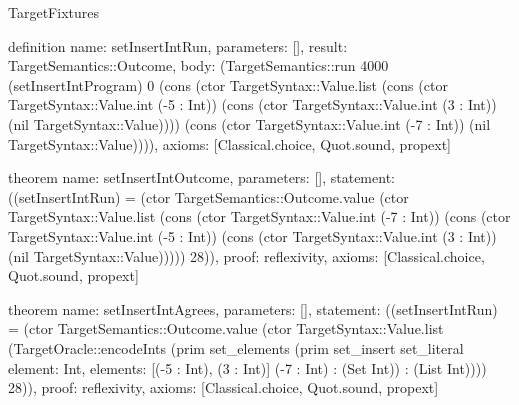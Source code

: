\begin{lexlean}{TargetFixtures}
\begin{semanticmodule}
definition{
  name: setInsertIntRun,
  parameters: [],
  result: TargetSemantics::Outcome,
  body: (TargetSemantics::run 4000 (setInsertIntProgram) 0 (cons (ctor TargetSyntax::Value.list (cons (ctor TargetSyntax::Value.int (-5 : Int)) (cons (ctor TargetSyntax::Value.int (3 : Int)) (nil TargetSyntax::Value)))) (cons (ctor TargetSyntax::Value.int (-7 : Int)) (nil TargetSyntax::Value)))),
  axioms: [Classical.choice, Quot.sound, propext]
}

theorem{
  name: setInsertIntOutcome,
  parameters: [],
  statement: ((setInsertIntRun) = (ctor TargetSemantics::Outcome.value (ctor TargetSyntax::Value.list (cons (ctor TargetSyntax::Value.int (-7 : Int)) (cons (ctor TargetSyntax::Value.int (-5 : Int)) (cons (ctor TargetSyntax::Value.int (3 : Int)) (nil TargetSyntax::Value))))) 28)),
  proof: reflexivity{},
  axioms: [Classical.choice, Quot.sound, propext]
}

theorem{
  name: setInsertIntAgrees,
  parameters: [],
  statement: ((setInsertIntRun) = (ctor TargetSemantics::Outcome.value (ctor TargetSyntax::Value.list (TargetOracle::encodeInts (prim set_elements (prim set_insert set_literal{
    element: Int,
    elements: [(-5 : Int), (3 : Int)]
  } (-7 : Int) : (Set Int)) : (List Int)))) 28)),
  proof: reflexivity{},
  axioms: [Classical.choice, Quot.sound, propext]
}


\end{semanticmodule}
\end{lexlean}
